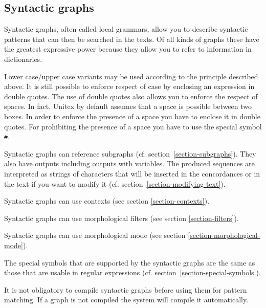 \subsection{Syntactic graphs}
Syntactic graphs, often called local grammars, allow you to describe syntactic
patterns that can then be searched in the texts. Of all kinds of graphs these
have the greatest expressive power because they allow you to refer to information
in dictionaries. 

\bigskip
\noindent Lower case/upper case variants may be used according to the principle described
above. It is still possible to enforce respect of case by enclosing an
expression in double quotes. The use of double quotes also allows you to enforce
the respect of spaces. In fact, Unitex by default assumes that a space is possible between two
boxes. In order to enforce the presence of a space you have to enclose it in
double quotes. For prohibiting the presence of a space you have to use the
special symbol \verb+#+.\index{\verb+#+}

\bigskip
\noindent Syntactic graphs can reference subgraphs (cf.
section~\ref{section-subgraphs}). They also have outputs including outputs
with variables. The produced sequences are interpreted as strings of characters
that will be inserted in the concordances or in the text if you want to modify it
(cf. section~\ref{section-modifying-text}).

\bigskip
\noindent Syntactic graphs can use contexts (see section
\ref{section-contexts}).

\bigskip
\noindent Syntactic graphs can use morphological filters (see section
\ref{section-filters}).

\bigskip
\noindent Syntactic graphs can use morphological mode (see section
\ref{section-morphological-mode}).

\bigskip
\noindent The special symbols that are supported by the syntactic graphs are the same as those that
are usable in regular expressions (cf.
section~\ref{section-special-symbols}).

\bigskip
\noindent It is not obligatory to compile syntactic graphs before using them for
pattern matching. If a graph is not compiled the system will compile it
automatically.

